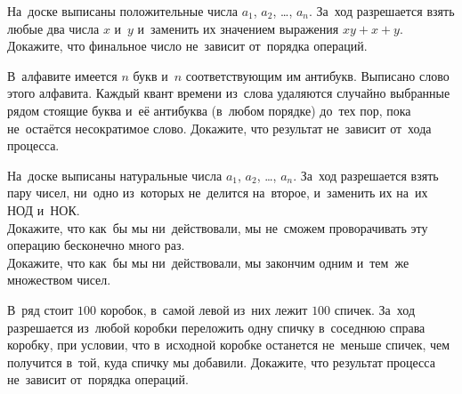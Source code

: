 \begin{problems}

\item
На~доске выписаны положительные числа $a_{1}$, $a_{2}$, \ldots, $a_{n}$.
За~ход разрешается взять любые два числа $x$ и~$y$ и~заменить их значением
выражения $x y +x + y$.
Докажите, что финальное число не~зависит от~порядка операций.

\item
В~алфавите имеется $n$ букв и~$n$ соответствующим им антибукв.
Выписано слово этого алфавита.
Каждый квант времени из~слова удаляются случайно выбранные рядом стоящие буква
и~её антибуква (в~любом порядке) до~тех пор, пока не~остаётся несократимое
слово.
Докажите, что результат не~зависит от~хода процесса.

\item
На~доске выписаны натуральные числа $a_{1}$, $a_{2}$, \ldots, $a_{n}$.
За~ход разрешается взять пару чисел, ни~одно из~которых не~делится на~второе,
и~заменить их на~их НОД и~НОК.
\\
\subproblem
Докажите, что как~бы мы ни~действовали, мы не~сможем проворачивать эту операцию
бесконечно много раз.
\\
\subproblem
Докажите, что как~бы мы ни~действовали, мы закончим одним и~тем~же множеством
чисел.

\item
В~ряд стоит $100$ коробок, в~самой левой из~них лежит $100$ спичек.
За~ход разрешается из~любой коробки переложить одну спичку в~соседнюю справа
коробку, при условии, что в~исходной коробке останется не~меньше спичек, чем
получится в~той, куда спичку мы добавили.
Докажите, что результат процесса не~зависит от~порядка операций.

\end{problems}

